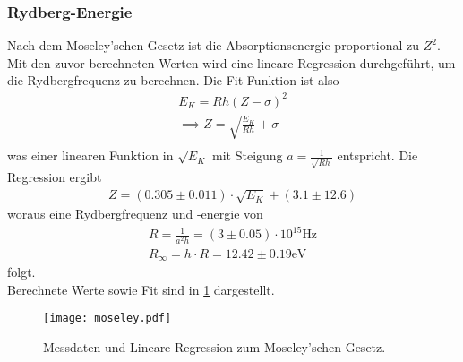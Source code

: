   \subsubsection{Rydberg-Energie}
    Nach dem Moseley'schen Gesetz ist die Absorptionsenergie proportional zu $Z^2$. Mit den zuvor 
    berechneten Werten wird eine lineare Regression durchgeführt, um die Rydbergfrequenz zu berechnen.
    Die Fit-Funktion ist also 
    \begin{align*}
      E_K = R h (Z - \sigma)^2\\
      \implies Z = \sqrt{\frac{E_K}{R h}} + \sigma\\
    \end{align*}
    was einer linearen Funktion in $\sqrt{E_K}$ mit Steigung $a = \frac{1}{\sqrt{R h}}$ entspricht.
    Die Regression ergibt
    \begin{align*}
      Z = (0.305 \pm 0.011) \cdot \sqrt{E_K} + (3.1 \pm 12.6)
    \end{align*}
    woraus eine Rydbergfrequenz und -energie von
    \begin{align*}
      R = \frac{1}{a^2 h} = (3 \pm 0.05) \cdot 10^{15} \si{\Hz}\\
      R_{\infty} = h \cdot R = 12.42 \pm 0.19 \text{eV}
    \end{align*}
    folgt.\\
    Berechnete Werte sowie Fit sind in \ref{fig:moseley} dargestellt.

    \begin{figure}
      \centering
      \texttt{[image: moseley.pdf]}
      \caption{Messdaten und Lineare Regression zum Moseley'schen Gesetz.}
      \label{fig:moseley}
    \end{figure}

    \FloatBarrier